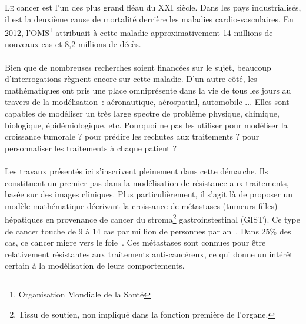 \documentclass[main.tex]{subfiles}
\begin{document}

\lettrine{L}{e} cancer est l'un des plus grand fléau du XXI\ieme %
siècle.  Dans les pays industrialisés, il est la deuxième cause de mortalité derrière les maladies cardio-vasculaires. 
En 2012, l'OMS\footnote{Organisation Mondiale de la Santé} attribuait à cette maladie approximativement 14 millions de nouveaux cas et 8,2 millions de décès. 

\paragraph{}
 Bien que de nombreuses recherches soient financées sur le sujet, beaucoup d'interrogations   règnent encore sur cette maladie. D'un autre côté, les mathématiques ont pris une place omniprésente dans la vie de tous les jours au travers de la modélisation~: aéronautique, aérospatial, automobile ... Elles sont capables de modéliser un très large spectre de problème physique, chimique, biologique, épidémiologique, etc. Pourquoi ne pas les utiliser pour modéliser la croissance tumorale ? pour prédire les rechutes aux traitements ? pour personnaliser les traitements à chaque patient ? 
 
\paragraph{}
Les travaux présentés ici s'inscrivent pleinement dans cette démarche. Ils constituent un premier pas dans la modélisation de résistance aux traitements, basée sur des images cliniques. 
Plus particulièrement, il s'agit là de proposer un modèle mathématique décrivant la croissance de métastases (tumeurs filles) hépatiques en provenance de cancer du stroma\footnote{Tissu de soutien, non impliqué dans la fonction première de l'organe.} gastroinstestinal (GIST). Ce type de cancer touche de 9 à 14 cas par million de personnes par an~\cite{Nilsson2005}. Dans 25\% des cas, ce cancer migre vers le foie~\cite{Nilsson2005}. Ces métastases sont connues pour être relativement résistantes aux traitements anti-cancéreux, ce qui donne un intérêt certain à la modélisation de leurs comportements. 
\end{document}
